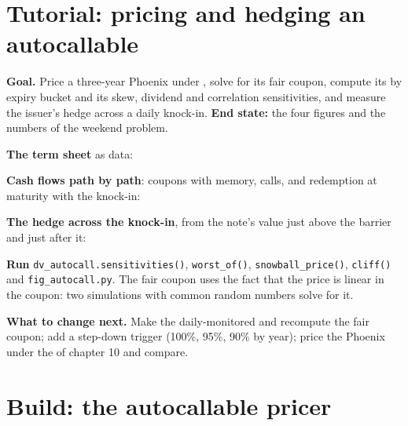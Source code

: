 \section{Tutorial: pricing and hedging an autocallable}\label{tut:dv:autocallables:tut}

\begin{tutorial}
\textbf{Goal.} Price a three-year Phoenix under , solve for its fair coupon, compute its  by expiry bucket and its
skew, dividend and correlation sensitivities, and measure the issuer's hedge across a daily knock-in. \textbf{End state:} the four
figures and the numbers of the weekend problem.
\begin{tutsteps}
\item \textbf{The term sheet} as data:
\label{lst:dv:autocallables:termsheet}
\item \textbf{Cash flows path by path}: coupons with memory, calls, and redemption at maturity with the knock-in:
\label{lst:dv:autocallables:cashflows}
\item \textbf{The hedge across the knock-in}, from the note's value just above the barrier and just after it:
\label{lst:dv:autocallables:cliff}
\item \textbf{Run} \texttt{dv\_autocall.sensitivities()}, \texttt{worst\_of()}, \texttt{snowball\_price()}, \texttt{cliff()} and
\texttt{fig\_autocall.py}. The fair coupon uses the fact that the price is linear in the coupon: two simulations with common random
numbers solve for it.
\end{tutsteps}
\textbf{What to change next.} Make the  daily-monitored and recompute the fair coupon; add a step-down trigger (100\%,
95\%, 90\% by year); price the Phoenix under the  of chapter 10 and compare.
\end{tutorial}

\section{Build: the autocallable pricer}\label{bld:dv:autocallables:autocall}

